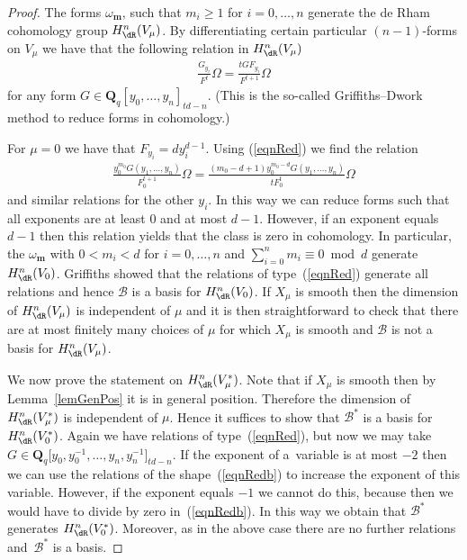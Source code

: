 \begin{proof} The forms $\omega_{\mathbf{m}}$, such that $m_i \geq 1$ for $i=0,\dots,n$ generate the de Rham cohomology group $H^n_{\dR}(V_\mu)$.
By dif\/ferentiating certain particular $(n-1)$-forms on $V_\mu$ we have that the following relation in $H^n_{\dR}(V_\mu)$
\begin{gather}\label{eqnRed} \frac{G_{y_i}}{F^t} \Omega = \frac{t G F_{y_i}}{F^{t+1}} \Omega \end{gather}
for any form $G\in \mathbf{Q}_q[y_0,\dots,y_n]_{td-n}$. (This is the so-called Grif\/f\/iths--Dwork method to reduce forms in cohomology.)

For $\mu=0$ we have that $F_{y_i}=dy_i^{d-1}$. Using (\ref{eqnRed}) we f\/ind the relation \begin{gather} \label{eqnRedb} \frac{y_0^{m_0} G(y_1,\dots,y_n)}{F_0^{t+1}}\Omega = \frac{(m_0-d+1)y_0^{m_0-d} G(y_1,\dots,y_n)}{t F_0^t} \Omega\end{gather}
and similar relations for the other $y_i$. In this way we can reduce forms such that all exponents are at least $0$ and at most $d-1$. However, if an exponent equals $d-1$ then this relation yields that the class is zero in cohomology. In particular, the $\omega_{\mathbf{m}}$ with $0<m_i<d$ for $i=0,\dots, n$ and $\sum\limits_{i=0}^n m_i\equiv 0 \bmod d$ generate $H^n_{\dR}(V_0)$. Grif\/f\/iths \cite{GriRat} showed that the relations of type~(\ref{eqnRed}) generate all relations and hence $\mathcal{B}$ is a basis for $H^n_{\dR}(V_0)$. If $X_\mu$ is smooth then the dimension of $H^n_{\dR}(V_\mu)$ is independent of $\mu$ and it is then straightforward to check that there are at most f\/initely many choices of $\mu$ for which $X_\mu$ is smooth and $\mathcal{B}$ is not a basis for $H^n_{\dR}(V_\mu)$.

We now prove the statement on $H^n_{\dR}(V_\mu^*)$. Note that if $X_\mu$ is smooth then by Lemma~\ref{lemGenPos} it is in general position. Therefore the dimension of $H^n_{\dR}(V_\mu^*)$ is independent of $\mu$. Hence it suf\/f\/ices to show that $\mathcal{B}^*$ is a basis for $H^n_{\dR}(V_0^*)$. Again we have relations of type~(\ref{eqnRed}), but now we may take $G\in \mathbf{Q}_q\big[y_0,y_0^{-1},\dots,y_n,y_n^{-1}\big]_{td-n}$. If the exponent of a~variable is at most $-2$ then we can use the relations of the shape~(\ref{eqnRedb}) to increase the exponent of this variable. However, if the exponent equals $-1$ we cannot do this, because then we would have to divide by zero in~(\ref{eqnRedb}). In this way we obtain that $\mathcal{B}^*$ generates $H^n_{\dR}(V^*_0)$. Moreover, as in the above case there are no further relations and~$\mathcal{B}^*$ is a basis.
\end{proof}

